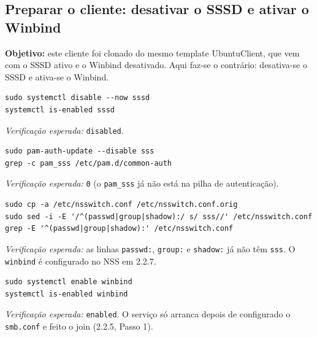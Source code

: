 
\subsection[Preparar o cliente: desativar o SSSD e ativar o Winbind]{Preparar o cliente: desativar o SSSD e ativar o Winbind}


\textbf{Objetivo:} este cliente foi clonado do mesmo template UbuntuClient, que vem com o SSSD ativo e o Winbind desativado. Aqui faz-se o contrário: desativa-se o SSSD e ativa-se o Winbind.


\begin{lstlisting}[style=bashstyle]
sudo systemctl disable --now sssd
systemctl is-enabled sssd
\end{lstlisting}

\emph{Verificação esperada:} \texttt{disabled}.


\begin{lstlisting}[style=bashstyle]
sudo pam-auth-update --disable sss
grep -c pam_sss /etc/pam.d/common-auth
\end{lstlisting}

\emph{Verificação esperada:} \texttt{0} (o \texttt{pam\_sss} já não está na pilha de autenticação).


\begin{lstlisting}[style=bashstyle]
sudo cp -a /etc/nsswitch.conf /etc/nsswitch.conf.orig
sudo sed -i -E '/^(passwd|group|shadow):/ s/ sss//' /etc/nsswitch.conf
grep -E '^(passwd|group|shadow):' /etc/nsswitch.conf
\end{lstlisting}

\emph{Verificação esperada:} as linhas \texttt{passwd:}, \texttt{group:} e \texttt{shadow:} já não têm \texttt{sss}. O \texttt{winbind} é configurado no NSS em 2.2.7.


\begin{lstlisting}[style=bashstyle]
sudo systemctl enable winbind
systemctl is-enabled winbind
\end{lstlisting}

\emph{Verificação esperada:} \texttt{enabled}. O serviço só arranca depois de configurado o \texttt{smb.conf} e feito o join (2.2.5, Passo 1).


